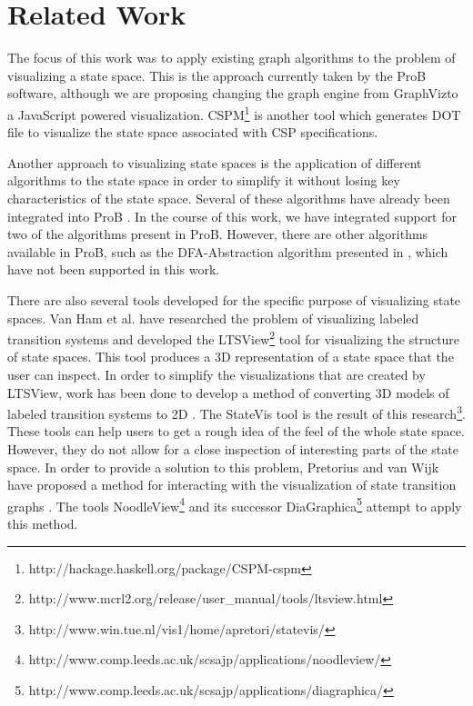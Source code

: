 \section{Related Work}

The focus of this work was to apply existing graph algorithms to the problem of visualizing a state space. This is the approach currently taken by the ProB software, although we are proposing changing the graph engine from GraphViz\footnotemark[1] to a JavaScript powered visualization. CSPM\footnote{http://hackage.haskell.org/package/CSPM-cspm} is another tool which generates DOT file to visualize the state space associated with CSP specifications.

Another approach to visualizing state spaces is the application of different algorithms to the state space in order to simplify it without losing key characteristics of the state space. Several of these algorithms have already been integrated into ProB \cite{LeTu05_8}. In the course of this work, we have integrated support for two of the algorithms present in ProB. However, there are other algorithms available in ProB, such as the DFA-Abstraction algorithm presented in \cite{LeTu05_8}, which have not been supported in this work. 

There are also several tools developed for the specific purpose of visualizing state spaces. Van Ham et al. \cite{Ham02} have researched the problem of visualizing labeled transition systems and developed the LTSView\footnote{http://www.mcrl2.org/release/user\_manual/tools/ltsview.html} tool for visualizing the structure of state spaces. This tool produces a 3D representation of a state space that the user can inspect. In order to simplify the visualizations that are created by LTSView, work has been done to develop a method of converting 3D models of labeled transition systems to 2D \cite{Pretorius2005}. The StateVis tool is the result of this research\footnote{http://www.win.tue.nl/vis1/home/apretori/statevis/}. These tools can help users to get a rough idea of the feel of the whole state space. However, they do not allow for a close inspection of interesting parts of the state space. In order to provide a solution to this problem, Pretorius and van Wijk have proposed a method for interacting with the visualization of state transition graphs \cite{Pretorius2006}. The tools NoodleView\footnote{http://www.comp.leeds.ac.uk/scsajp/applications/noodleview/} and its successor DiaGraphica\footnote{http://www.comp.leeds.ac.uk/scsajp/applications/diagraphica/} attempt to apply this method.
